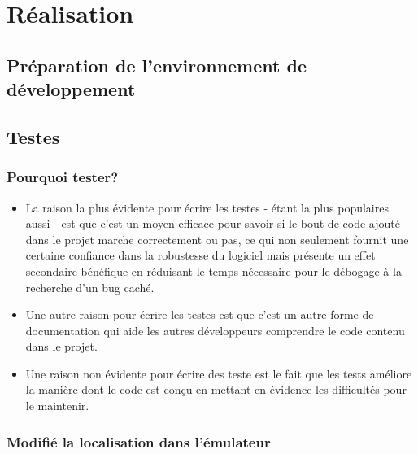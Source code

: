 
\chapter{Réalisation}
\section{Préparation de l'environnement de développement}%
\section{Testes}
\subsection{Pourquoi tester?~\cite{pycon:getting_started_with_automated_testing}}
\begin{itemize}
\item La raison la plus évidente pour écrire les testes - étant la plus populaires aussi - est que c'est un moyen efficace pour savoir si le bout de code ajouté dans le projet marche correctement ou pas, ce qui non seulement fournit une certaine confiance dans la robustesse du logiciel mais présente un effet secondaire bénéfique en réduisant le temps nécessaire pour le débogage à la recherche d'un bug caché. %
\item Une autre raison pour écrire les testes est que c'est un autre forme de documentation qui aide les autres développeurs comprendre le code contenu dans le projet.
\item Une raison non évidente pour écrire des teste est le fait que les tests améliore la manière dont le code est conçu en mettant en évidence les difficultés pour le maintenir.
\end{itemize}
\subsection{Modifié la localisation dans l'émulateur}%
